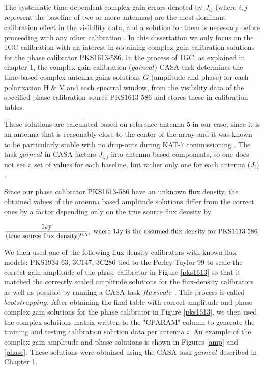The systematic time-dependent complex gain errors denoted by $J_{ij}$ (where $i,j$ represent the baseline of two or more antennas) are the most dominant calibration effect in the visibility data, and a solution for them is necessary before proceeding with any other calibration \citep{ott2013casa}. In this dissertation we only focus on the 1GC calibration with an interest in obtaining complex gain calibration solutions for the phase calibrator PKS1613-586. In the process of 1GC, as explained in chapter 1, the complex gain calibration ($\textit{gaincal}$)  CASA task determines the time-based complex antenna gains solutions $G$ (amplitude and phase) for each polarization H \& V and each spectral window, from the visibility data of the specified phase calibration source PKS1613-586 and stores these in calibration tables.
 
These solutions are calculated based on reference antenna 5 in our case, since it is an antenna that is reasonably close to the center of the array and it was known to be particularly stable with no drop-outs during KAT-7 commissioning \citep{ott2013casa}. The task $\textit{gaincal}$ in CASA factors $J_{i,j}$ into antenna-based components, so one does not see a set of values for each baseline, but rather only one for each antenna ($J_i$) \citep{CosmoAIMS}. 

Since our phase calibrator PKS1613-586 have an unknown flux density, the obtained values of the antenna based amplitude solutions differ from the correct ones by a factor depending only on the true source flux density by 

\begin{equation}
\frac{1 \mathrm{Jy}}{(\text{true source flux density})^{0.5}},\;  \text{where 1Jy is the assumed flux density for \text{PKS1613-586}}.
\end{equation} 

We then used one of the following flux-density calibrators with known flux models: PKS1934-63, 3C147, 3C286 tied to the Perley-Taylor 99 to scale the correct gain amplitude of the phase calibrator in Figure \ref{pks1613} so that it matched the correctly scaled amplitude solutions for the flux-density calibrators as well as possible by running a CASA task $\textit{fluxscale}$ \citep{CosmoAIMS}. This process is called $\textit{bootstrapping}$. After obtaining the final table with correct amplitude and phase complex gain solutions for the phase calibrator in Figure \ref{pks1613}, we then used the complex solutions matrix written to the "CPARAM" column to generate the training and testing calibration solution data per antenna $i$. An example of the complex gain amplitude and phase solutions is shown in Figures \ref{amp} and \ref{phase}. These solutions were obtained using the CASA task $gaincal$ described in Chapter 1. 

